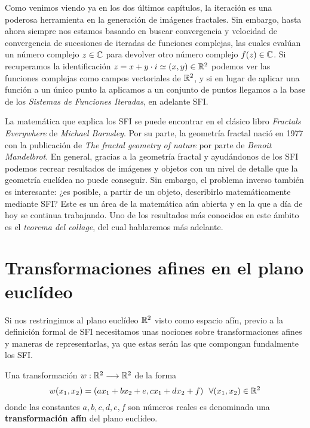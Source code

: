 
Como venimos viendo ya en los dos últimos capítulos, la iteración es una poderosa herramienta en la generación de imágenes fractales. Sin embargo, hasta ahora siempre nos estamos basando en buscar convergencia y velocidad de convergencia de sucesiones de iteradas de funciones complejas, las cuales evalúan un número complejo $z\in\mathbb{C}$ para devolver otro número complejo $f(z)\in\mathbb{C}$. Si recuperamos la identificación $z=x+y\cdot i\simeq (x,y)\in\mathbb{R}^2$ podemos ver las funciones complejas como campos vectoriales de $\mathbb{R}^2$, y si en lugar de aplicar una función a un único punto la aplicamos a un conjunto de puntos llegamos a la base de los \textit{Sistemas de Funciones Iteradas}, en adelante SFI. 

La matemática que explica los SFI se puede encontrar en el clásico libro \textit{Fractals Everywhere}\cite{Barnsley} de \textit{Michael Barnsley}. Por su parte, la geometría fractal nació en 1977 con la publicación de \textit{The fractal geometry of nature}\cite{alma991007242979704990} por parte de \textit{Benoit Mandelbrot}. En general, gracias a la geometría fractal y ayudándonos de los SFI podemos recrear resultados de imágenes y objetos con un nivel de detalle que la geometría euclídea no puede conseguir. Sin embargo, el problema inverso también es interesante: ¿es posible, a partir de un objeto, describirlo matemáticamente mediante SFI? Este es un área de la matemática aún abierta y en la que a día de hoy se continua trabajando. Uno de los resultados más conocidos en este ámbito es el \textit{teorema del collage}, del cual hablaremos más adelante. %

\section{Transformaciones afines en el plano euclídeo}

Si nos restringimos al plano euclídeo $\mathbb{R}^2$ visto como espacio afín, previo a la definición formal de SFI necesitamos unas nociones sobre transformaciones afines y maneras de representarlas, ya que estas serán las que compongan fundalmente los SFI.

\begin{definicion}
    Una transformación $w:\mathbb{R}^2\longrightarrow\mathbb{R}^2$ de la forma
    \begin{equation}
        w(x_1,x_2)=(ax_1+bx_2+e,cx_1+dx_2+f) \ \ \forall (x_1,x_2)\in\mathbb{R}^2
    \end{equation}
    donde las constantes $a,b,c,d,e,f$ son números reales es denominada una \textbf{transformación afín} del plano euclídeo.
\end{definicion}

